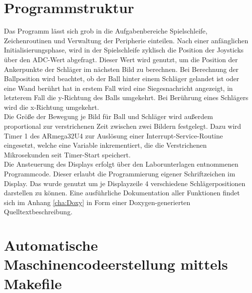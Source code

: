 \section{Programmstruktur}
\label{sec:Prog}
Das Programm lässt sich grob in die Aufgabenbereiche Spielschleife, Zeichenroutinen und Verwaltung der Peripherie einteilen. Nach einer anfänglichen Initialisierungsphase, wird in der Spielschleife zyklisch die Position der Joysticks über den ADC-Wert abgefragt. Dieser Wert wird genutzt, um die Position der Ankerpunkte der Schläger im nächsten Bild zu berechnen. Bei Berechnung der Ballposition wird beachtet, ob der Ball hinter einem Schläger gelandet ist oder eine Wand berührt hat in erstem Fall wird eine Siegesnachricht angezeigt, in letzterem Fall die y-Richtung des Balls umgekehrt. Bei Berührung eines Schlägers wird die x-Richtung umgekehrt.\\
Die Größe der Bewegung je Bild für Ball und Schläger wird außerdem proportional zur verstrichenen Zeit zwischen zwei Bildern festgelegt. Dazu wird Timer 1 des ARmega32U4 zur Auslösung einer Interrupt-Service-Routine eingesetzt, welche eine Variable inkrementiert, die die Verstrichenen Mikrosekunden seit Timer-Start speichert.\\
Die Ansteuerung des Displays erfolgt über den Laborunterlagen entnommenen Programmcode. Dieser erlaubt die Programmierung eigener Schriftzeichen im Display. Das wurde genutzt um je Displayzeile 4 verschiedene Schlägerpositionen darstellen zu können.
Eine ausführliche Dokumentation aller Funktionen findet sich im Anhang \ref{cha:Doxy} in Form einer Doxygen-generierten Quelltextbeschreibung.

\section{Automatische Maschinencodeerstellung mittels Makefile}
\label{sec:Make}


 

